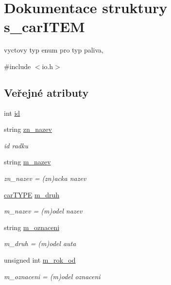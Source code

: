 \hypertarget{structs__carITEM}{
\section{\-Dokumentace struktury s\-\_\-car\-I\-T\-E\-M}
\label{d7/da8/structs__carITEM}
}


vyctovy typ enum pro typ paliva,  




{\ttfamily \#include $<$io.\-h$>$}

\subsection*{\-Veřejné atributy}
\begin{DoxyCompactItemize}
\item 
int \hyperlink{structs__carITEM_ac3fb1808cd4c5d9db744b2342efebd01}{id}
\item 
string \hyperlink{structs__carITEM_a0645a77c08276a5d14a7d21f5e0f21de}{zn\-\_\-nazev}
\begin{DoxyCompactList}\small\item\em id radku \end{DoxyCompactList}\item 
string \hyperlink{structs__carITEM_aad62e052d82d733a186d4dc5401da634}{m\-\_\-nazev}
\begin{DoxyCompactList}\small\item\em zn\-\_\-nazev = (zn)acka nazev \end{DoxyCompactList}\item 
\hyperlink{io_8h_a3092c477112abb33d997526688293bed}{car\-T\-Y\-P\-E} \hyperlink{structs__carITEM_a4173c03873679957370ee10781c99291}{m\-\_\-druh}
\begin{DoxyCompactList}\small\item\em m\-\_\-nazev = (m)odel nazev \end{DoxyCompactList}\item 
string \hyperlink{structs__carITEM_a3fb9d29cae50d02de945bdac1b9e7af6}{m\-\_\-oznaceni}
\begin{DoxyCompactList}\small\item\em m\-\_\-druh = (m)odel auta \end{DoxyCompactList}\item 
unsigned int \hyperlink{structs__carITEM_a577c657f610b4f7d778c0aa213ea08c9}{m\-\_\-rok\-\_\-od}
\begin{DoxyCompactList}\small\item\em m\-\_\-oznaceni = (m)odel oznaceni \end{DoxyCompactList}\item 

\end{DoxyCompactItemize}
